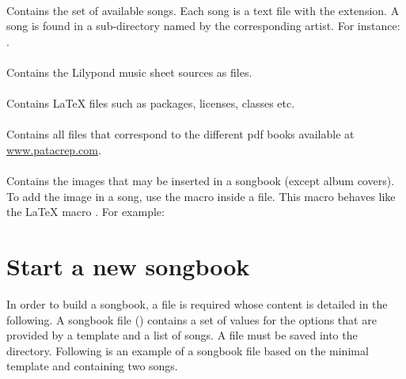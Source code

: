 \paragraph{}
Contains the set of available songs. Each song is a text file with the
 extension. A song is found in a sub-directory named by the
corresponding artist. For instance:
.

\paragraph{}
Contains the Lilypond music sheet sources as  files.

\paragraph{}
Contains \LaTeX{} files such as packages, licenses, classes etc.

\paragraph{}
Contains all  files that correspond to the different pdf books
available at \url{www.patacrep.com}.

\paragraph{}
Contains the images that may be inserted in a songbook (except album
covers). To add the image  in a song, use the
 macro inside a  file. This macro behaves like
the \LaTeX{} macro . For example:

\begin{songbook}
\end{songbook}

\section{Start a new songbook}
\label{sec:create-songbook}

In order to build a songbook, a  file is required whose
content is detailed in the following. A songbook file ()
contains a set of values for the options that are provided by a
template and a list of songs.  A  file must be saved into the
 directory. Following is an example of a songbook
file based on the minimal template and containing two songs.

